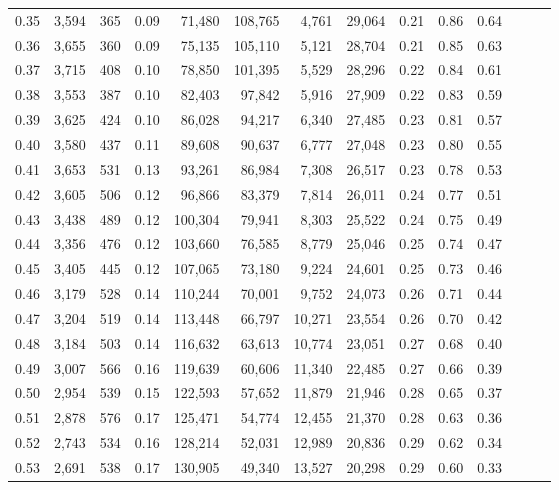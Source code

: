 \begin{tabular}{rrrrrrrrrrrrrr}
0.35 &  3,594 &  365 &  0.09 &   71,480 &  108,765 &   4,761 &  29,064 &  0.21 &  0.86 &      0.64 \\
0.36 &  3,655 &  360 &  0.09 &   75,135 &  105,110 &   5,121 &  28,704 &  0.21 &  0.85 &      0.63 \\
0.37 &  3,715 &  408 &  0.10 &   78,850 &  101,395 &   5,529 &  28,296 &  0.22 &  0.84 &      0.61 \\
0.38 &  3,553 &  387 &  0.10 &   82,403 &   97,842 &   5,916 &  27,909 &  0.22 &  0.83 &      0.59 \\
0.39 &  3,625 &  424 &  0.10 &   86,028 &   94,217 &   6,340 &  27,485 &  0.23 &  0.81 &      0.57 \\
0.40 &  3,580 &  437 &  0.11 &   89,608 &   90,637 &   6,777 &  27,048 &  0.23 &  0.80 &      0.55 \\
0.41 &  3,653 &  531 &  0.13 &   93,261 &   86,984 &   7,308 &  26,517 &  0.23 &  0.78 &      0.53 \\
0.42 &  3,605 &  506 &  0.12 &   96,866 &   83,379 &   7,814 &  26,011 &  0.24 &  0.77 &      0.51 \\
0.43 &  3,438 &  489 &  0.12 &  100,304 &   79,941 &   8,303 &  25,522 &  0.24 &  0.75 &      0.49 \\
0.44 &  3,356 &  476 &  0.12 &  103,660 &   76,585 &   8,779 &  25,046 &  0.25 &  0.74 &      0.47 \\
0.45 &  3,405 &  445 &  0.12 &  107,065 &   73,180 &   9,224 &  24,601 &  0.25 &  0.73 &      0.46 \\
0.46 &  3,179 &  528 &  0.14 &  110,244 &   70,001 &   9,752 &  24,073 &  0.26 &  0.71 &      0.44 \\
0.47 &  3,204 &  519 &  0.14 &  113,448 &   66,797 &  10,271 &  23,554 &  0.26 &  0.70 &      0.42 \\
0.48 &  3,184 &  503 &  0.14 &  116,632 &   63,613 &  10,774 &  23,051 &  0.27 &  0.68 &      0.40 \\
0.49 &  3,007 &  566 &  0.16 &  119,639 &   60,606 &  11,340 &  22,485 &  0.27 &  0.66 &      0.39 \\
0.50 &  2,954 &  539 &  0.15 &  122,593 &   57,652 &  11,879 &  21,946 &  0.28 &  0.65 &      0.37 \\
0.51 &  2,878 &  576 &  0.17 &  125,471 &   54,774 &  12,455 &  21,370 &  0.28 &  0.63 &      0.36 \\
0.52 &  2,743 &  534 &  0.16 &  128,214 &   52,031 &  12,989 &  20,836 &  0.29 &  0.62 &      0.34 \\
0.53 &  2,691 &  538 &  0.17 &  130,905 &   49,340 &  13,527 &  20,298 &  0.29 &  0.60 &      0.33 \\

\end{tabular}
